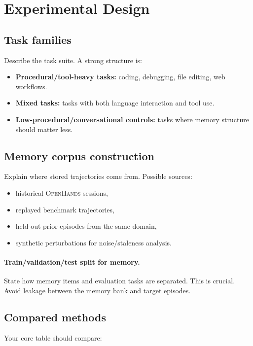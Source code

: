 \documentclass{article}
\newcommand{\OH}{\textsc{OpenHands}}
\begin{document}
\section{Experimental Design}

\subsection{Task families}
Describe the task suite.
A strong structure is:
\begin{itemize}[leftmargin=*,itemsep=2pt,topsep=2pt]
    \item \textbf{Procedural/tool-heavy tasks:} coding, debugging, file editing, web workflows.
    \item \textbf{Mixed tasks:} tasks with both language interaction and tool use.
    \item \textbf{Low-procedural/conversational controls:} tasks where memory structure should matter less.
\end{itemize}

\subsection{Memory corpus construction}
Explain where stored trajectories come from.
Possible sources:
\begin{itemize}[leftmargin=*,itemsep=2pt,topsep=2pt]
    \item historical \OH{} sessions,
    \item replayed benchmark trajectories,
    \item held-out prior episodes from the same domain,
    \item synthetic perturbations for noise/staleness analysis.
\end{itemize}

\paragraph{Train/validation/test split for memory.}
State how memory items and evaluation tasks are separated.
This is crucial.
Avoid leakage between the memory bank and target episodes.

\subsection{Compared methods}
Your core table should compare:
\end{document}
